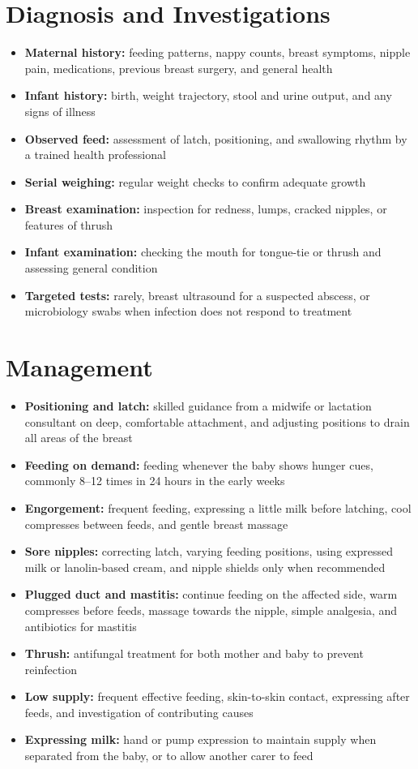 \section*{Diagnosis and Investigations}
\begin{itemize}
    \item \textbf{Maternal history:} feeding patterns, nappy counts, breast symptoms, nipple pain, medications, previous breast surgery, and general health
    \item \textbf{Infant history:} birth, weight trajectory, stool and urine output, and any signs of illness
    \item \textbf{Observed feed:} assessment of latch, positioning, and swallowing rhythm by a trained health professional
    \item \textbf{Serial weighing:} regular weight checks to confirm adequate growth
    \item \textbf{Breast examination:} inspection for redness, lumps, cracked nipples, or features of thrush
    \item \textbf{Infant examination:} checking the mouth for tongue-tie or thrush and assessing general condition
    \item \textbf{Targeted tests:} rarely, breast ultrasound for a suspected abscess, or microbiology swabs when infection does not respond to treatment
\end{itemize}

\section*{Management}
\begin{itemize}
    \item \textbf{Positioning and latch:} skilled guidance from a midwife or lactation consultant on deep, comfortable attachment, and adjusting positions to drain all areas of the breast
    \item \textbf{Feeding on demand:} feeding whenever the baby shows hunger cues, commonly 8--12 times in 24 hours in the early weeks
    \item \textbf{Engorgement:} frequent feeding, expressing a little milk before latching, cool compresses between feeds, and gentle breast massage
    \item \textbf{Sore nipples:} correcting latch, varying feeding positions, using expressed milk or lanolin-based cream, and nipple shields only when recommended
    \item \textbf{Plugged duct and mastitis:} continue feeding on the affected side, warm compresses before feeds, massage towards the nipple, simple analgesia, and antibiotics for mastitis
    \item \textbf{Thrush:} antifungal treatment for both mother and baby to prevent reinfection
    \item \textbf{Low supply:} frequent effective feeding, skin-to-skin contact, expressing after feeds, and investigation of contributing causes
    \item \textbf{Expressing milk:} hand or pump expression to maintain supply when separated from the baby, or to allow another carer to feed
\end{itemize}

